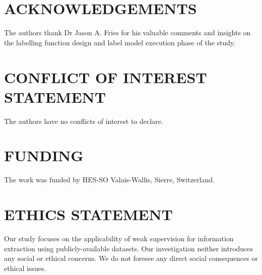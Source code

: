 \documentclass[10.7pt,]{article}
\begin{document}
\section{ACKNOWLEDGEMENTS}\label{acknowledgements}
%
The authors thank Dr Jason A. Fries for his valuable comments and insights on the labelling function design and label model execution phase of the study. 
%
%
%
\section{CONFLICT OF INTEREST STATEMENT}\label{conflictinterest}
%
The authors have no conflicts of interest to declare.
%
%
%
\section{FUNDING}\label{funding}
%
The work was funded by HES-SO Valais-Wallis, Sierre, Switzerland.
%
%
%
\section{ETHICS STATEMENT}\label{ethic}
%
Our study focuses on the applicability of weak supervision for information extraction using publicly-available datasets.
Our investigation neither introduces any social or ethical concerns.
We do not foresee any direct social consequences or ethical issues.
%
%
%
\printbibliography
%
%


%
%
%
\end{document}
